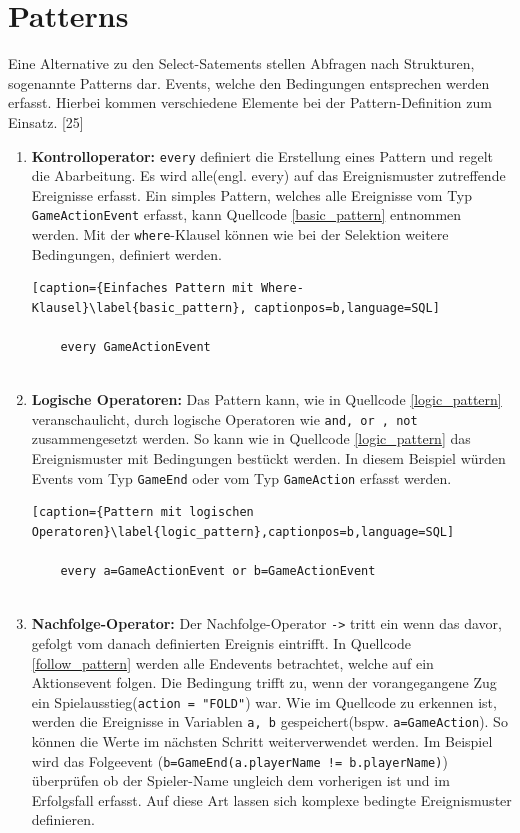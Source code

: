 \section{Patterns}

Eine Alternative zu den Select-Satements stellen Abfragen nach Strukturen, sogenannte Patterns dar. Events, welche den Bedingungen entsprechen werden erfasst. Hierbei kommen verschiedene Elemente bei der Pattern-Definition zum Einsatz.
\cite{EsperRef2018}[25]

\begin{enumerate}
	\item \textbf{Kontrolloperator:} \texttt{every} definiert die Erstellung eines Pattern und regelt die Abarbeitung. Es wird alle(engl. every) auf das Ereignismuster zutreffende Ereignisse erfasst. Ein simples Pattern, welches alle Ereignisse vom Typ \texttt{GameActionEvent} erfasst, kann Quellcode \ref{basic_pattern} entnommen werden.
	Mit der \texttt{where}-Klausel können wie bei der Selektion weitere Bedingungen, definiert werden.
	
	\begin{lstlisting}[caption={Einfaches Pattern mit Where-Klausel}\label{basic_pattern}, captionpos=b,language=SQL]
	
	every GameActionEvent
	
	\end{lstlisting}
	
	\item \textbf{Logische Operatoren:} 
	Das Pattern kann, wie in Quellcode \ref{logic_pattern} veranschaulicht, durch logische Operatoren wie \texttt{and, or , not} zusammengesetzt werden. So kann wie in Quellcode \ref{logic_pattern} das Ereignismuster mit Bedingungen bestückt werden. In diesem Beispiel würden Events vom Typ \texttt{GameEnd} oder vom Typ \texttt{GameAction} erfasst werden.
	
	\begin{lstlisting}[caption={Pattern mit logischen Operatoren}\label{logic_pattern},captionpos=b,language=SQL]
	
	every a=GameActionEvent or b=GameActionEvent
	
	\end{lstlisting}
	
	\item \textbf{Nachfolge-Operator:}
	Der Nachfolge-Operator \texttt{->} tritt ein wenn das davor, gefolgt vom danach definierten Ereignis eintrifft. In Quellcode \ref{follow_pattern}  werden alle Endevents betrachtet, welche auf ein Aktionsevent folgen. Die Bedingung trifft zu, wenn der vorangegangene Zug ein Spielausstieg(\texttt{action = "FOLD"}) war.
	Wie im Quellcode zu erkennen ist, werden die Ereignisse in Variablen \texttt{a, b} gespeichert(bspw. \texttt{a=GameAction}). So können die Werte im nächsten Schritt weiterverwendet werden. Im Beispiel wird das Folgeevent (\texttt{b=GameEnd(a.playerName != b.playerName)}) überprüfen ob der Spieler-Name ungleich dem vorherigen ist und im Erfolgsfall erfasst. Auf diese Art lassen sich komplexe bedingte Ereignismuster definieren.
	

\end{enumerate}
